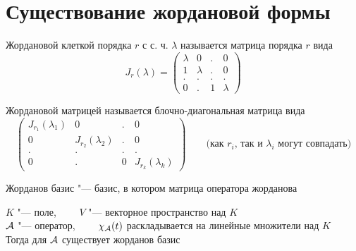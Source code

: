 \section{Существование жордановой формы}

\begin{definition}
	Жордановой клеткой порядка $ r $ с с. ч. $ \lambda $ называется матрица порядка $ r $ вида
	$$ J_r(\lambda) =
	\begin{pmatrix}
		\lambda & 0 & . & 0 \\
		1 & \lambda & . & 0 \\
		. & . & . & . \\
		0 & . & 1 & \lambda
	\end{pmatrix} $$
\end{definition}

\begin{definition}
	Жордановой матрицей называется блочно-диагональная матрица вида
	$$
	\begin{pmatrix}
		J_{r_1}(\lambda_1) & 0 & . & 0 \\
		0 & J_{r_2}(\lambda_2) & . & 0 \\
		. & . & . & . \\
		0 & . & 0 & J_{r_k}(\lambda_k)
	\end{pmatrix} \qquad \text{(как } r_i \text{, так и } \lambda_i \text{ могут совпадать)} $$
\end{definition}

\begin{definition}
	Жорданов базис "--- базис, в котором матрица оператора жорданова
\end{definition}

\begin{theorem}
	$ K $ "--- поле, $ \qquad V $ "--- векторное пространство над $ K $ \\
	$ \mathcal{A} $ "--- оператор, $ \qquad \chi_{\mathcal{A}}(t) $ раскладывается на линейные множители над $ K $ \\
	Тогда для $ \mathcal{A} $ существует жорданов базис
\end{theorem}

